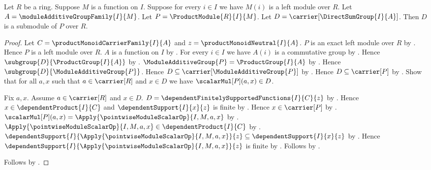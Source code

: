\begin{theorem}\label{direct_sum_module_carrier_is_submodule}
    Let $R$ be a ring.
    Suppose $M$ is a function on $I$.
    Suppose for every $i\in I$ we have $M(i)$ is a left module over $R$.
    Let $A=\moduleAdditiveGroupFamily{I}{M}$.
    Let $P=\ProductModule{R}{I}{M}$.
    Let $D=\carrier[\DirectSumGroup{I}{A}]$.
    Then $D$ is a submodule of $P$ over $R$.
\end{theorem}
\begin{proof}
    Let $C=\productMonoidCarrierFamily{I}{A}$ and
        $z=\productMonoidNeutral{I}{A}$.
    $P$ is an exact left module over $R$ by
        .
    Hence $P$ is a left module over $R$.
    $A$ is a function on $I$ by
        .
    For every $i\in I$ we have $A(i)$ is a commutative group by
        .
    Hence $\subgroup{D}{\ProductGroup{I}{A}}$ by
        .
    $\ModuleAdditiveGroup{P}=\ProductGroup{I}{A}$ by
        .
    Hence $\subgroup{D}{\ModuleAdditiveGroup{P}}$.
    Hence $D\subseteq\carrier[\ModuleAdditiveGroup{P}]$ by
        .
    Hence $D\subseteq\carrier[P]$ by
        .
    Show that for all $a,x$ such that $a\in\carrier[R]$ and $x\in D$
        we have $\scalarMul[P](a,x)\in D$.
    \begin{subproof}
        Fix $a,x$.
        Assume $a\in\carrier[R]$ and $x\in D$.
        $D=\dependentFinitelySupportedFunctions{I}{C}{z}$ by
            .
        Hence $x\in\dependentProduct{I}{C}$ and
            $\dependentSupport{I}{x}{z}$ is finite by
            .
        Hence $x\in\carrier[P]$ by .
        $\scalarMul[P](a,x)
            =\Apply{\pointwiseModuleScalarOp}{I,M,a,x}$ by
            .
        $\Apply{\pointwiseModuleScalarOp}{I,M,a,x}
            \in\dependentProduct{I}{C}$ by
            .
        $\dependentSupport{I}{
            \Apply{\pointwiseModuleScalarOp}{I,M,a,x}}{z}
            \subseteq\dependentSupport{I}{x}{z}$ by
            .
        Hence $\dependentSupport{I}{
            \Apply{\pointwiseModuleScalarOp}{I,M,a,x}}{z}$ is finite by
            .
        Follows by
            .
    \end{subproof}
    Follows by .
\end{proof}


